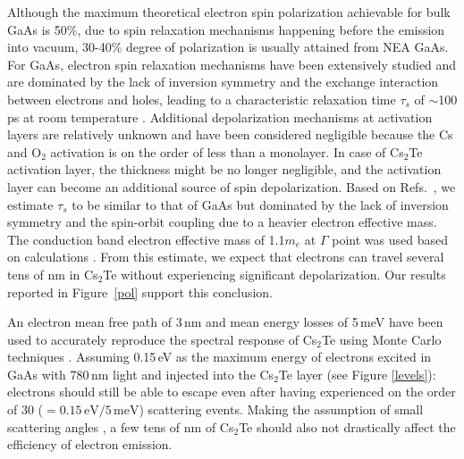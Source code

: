 Although the maximum theoretical electron spin polarization achievable for bulk GaAs is 50\%, due to spin relaxation mechanisms happening before the emission into vacuum, 30-40\% degree of polarization is usually attained from NEA GaAs. For GaAs, electron spin relaxation mechanisms have been extensively studied and are dominated by the lack of inversion symmetry and the exchange interaction between electrons and holes, leading to a characteristic relaxation time $\tau_s$ of $\sim$100 ps at room temperature \cite{fishman1977_SpinRelaxationPhotoelectrons,zutic2004_SpintronicsFundamentalsApplications,song2002_SpinRelaxationConduction}.
Additional depolarization mechanisms at activation layers are relatively unknown and have been considered negligible because the Cs and O$_2$ activation is on the order of less than a monolayer. In case of Cs$_2$Te activation layer, the thickness might be no longer negligible, and the activation layer can become an additional source of spin depolarization.
Based on Refs.~\cite{zutic2004_SpintronicsFundamentalsApplications,song2002_SpinRelaxationConduction}, we estimate $\tau_s$ to be similar to that of GaAs but dominated by the lack of inversion symmetry and the spin-orbit coupling due to a heavier electron effective mass. The conduction band electron effective mass of 1.1$m_e$ at $\Gamma$ point was used based on calculations \cite{terdik2012_AnomalousWorkFunction}. From this estimate, we expect that electrons can travel several tens of nm in Cs$_2$Te without experiencing significant depolarization. Our results reported in Figure~\ref{pol} support this conclusion.

An electron mean free path of 3\,nm and mean energy losses of 5\,meV have been used to accurately reproduce the spectral response of Cs$_2$Te using Monte Carlo techniques \cite{ferrini_MONTECARLOSIMULATION}. Assuming 0.15\,eV as the maximum energy of electrons excited in GaAs with 780\,nm light and injected into the Cs$_2$Te layer (see Figure \ref{levels}): electrons should still be able to escape even after having experienced on the order of 30 ($=0.15\,\mathrm{eV}/5\,\mathrm{meV}$) scattering events. Making the assumption of small scattering angles \cite{jacoboni1989_MonteCarloMethod}, a few tens of nm of Cs$_2$Te should also not drastically affect the efficiency of electron emission. 

